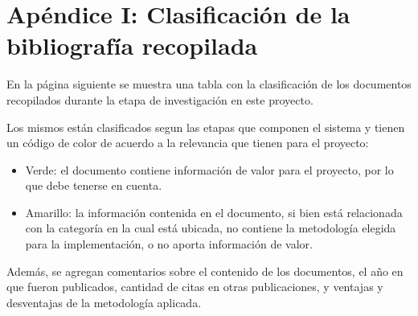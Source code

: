 \section{Apéndice I: Clasificación de la bibliografía recopilada}
\label{tablabiblio}
En la página siguiente se muestra una tabla con la clasificación de los documentos recopilados durante la etapa de investigación en este proyecto.

Los mismos están clasificados segun las etapas que componen el sistema y tienen un código de color de acuerdo a la relevancia que tienen para el proyecto:
\begin{itemize}
	\item Verde: el documento contiene información de valor para el proyecto, por lo que debe tenerse en cuenta.
	\item Amarillo: la información contenida en el documento, si bien está relacionada con la categoría en la cual está ubicada, no contiene la metodología elegida para la implementación, o no aporta información de valor. 
\end{itemize}

Además, se agregan comentarios sobre el contenido de los documentos, el año en que fueron publicados, cantidad de citas en otras publicaciones, y ventajas y desventajas de la metodología aplicada.


